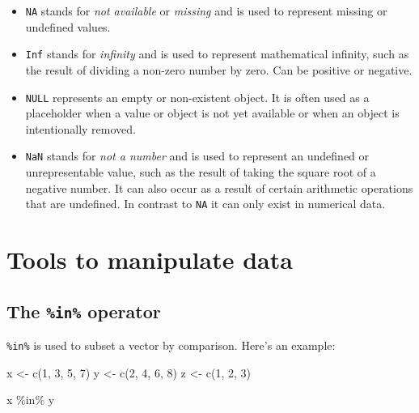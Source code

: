 \documentclass[
  12pt,
  oneside]{book}
\newenvironment{Shaded}{\begin{snugshade}}{\end{snugshade}}
\newcommand{\DecValTok}[1]{\textcolor[rgb]{0.00,0.00,0.81}{#1}}
\newcommand{\FunctionTok}[1]{\textcolor[rgb]{0.00,0.00,0.00}{#1}}
\newcommand{\NormalTok}[1]{#1}
\newcommand{\OtherTok}[1]{\textcolor[rgb]{0.56,0.35,0.01}{#1}}
\newcommand{\SpecialCharTok}[1]{\textcolor[rgb]{0.00,0.00,0.00}{#1}}
\providecommand{\tightlist}{%
  \setlength{\itemsep}{0pt}\setlength{\parskip}{0pt}}
\theoremstyle{definition}
\theoremstyle{definition}
\theoremstyle{definition}
\theoremstyle{definition}
\theoremstyle{remark}
\begin{document}
\begin{itemize}
\tightlist
\item
  \texttt{NA} stands for \emph{not available} or \emph{missing} and is used to represent missing or undefined values.
\item
  \texttt{Inf} stands for \emph{infinity} and is used to represent mathematical infinity, such as the result of dividing a non-zero number by zero. Can be positive or negative.\\
\item
  \texttt{NULL} represents an empty or non-existent object. It is often used as a placeholder when a value or object is not yet available or when an object is intentionally removed.
\item
  \texttt{NaN} stands for \emph{not a number} and is used to represent an undefined or unrepresentable value, such as the result of taking the square root of a negative number. It can also occur as a result of certain arithmetic operations that are undefined. In contrast to \texttt{NA} it can only exist in numerical data.
\end{itemize}

\hypertarget{tools-to-manipulate-data}{%
\section{Tools to manipulate data}\label{tools-to-manipulate-data}}

\hypertarget{the-in-operator}{%
\subsection{\texorpdfstring{The \texttt{\%in\%} operator}{The \%in\% operator}}\label{the-in-operator}}

\texttt{\%in\%} is used to subset a vector by comparison. Here's an example:

\begin{Shaded}
\begin{Highlighting}[]
\NormalTok{x }\OtherTok{\textless{}{-}} \FunctionTok{c}\NormalTok{(}\DecValTok{1}\NormalTok{, }\DecValTok{3}\NormalTok{, }\DecValTok{5}\NormalTok{, }\DecValTok{7}\NormalTok{)}
\NormalTok{y }\OtherTok{\textless{}{-}} \FunctionTok{c}\NormalTok{(}\DecValTok{2}\NormalTok{, }\DecValTok{4}\NormalTok{, }\DecValTok{6}\NormalTok{, }\DecValTok{8}\NormalTok{)}
\NormalTok{z }\OtherTok{\textless{}{-}} \FunctionTok{c}\NormalTok{(}\DecValTok{1}\NormalTok{, }\DecValTok{2}\NormalTok{, }\DecValTok{3}\NormalTok{)}

\NormalTok{x }\SpecialCharTok{\%in\%}\NormalTok{ y  }
\end{Highlighting}
\end{Shaded}
\end{document}
